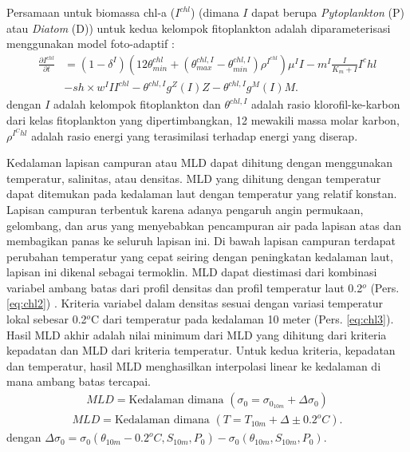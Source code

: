 \begin{spacing}{1.5}
	Persamaan untuk biomassa chl-a ($I^{chl}$) (dimana $I$ dapat berupa \textit{Pytoplankton} (P) atau \textit{Diatom} (D)) untuk kedua kelompok fitoplankton adalah diparameterisasi menggunakan model foto-adaptif :
	\begin{equation}\label{eq:chl1}
		\begin{aligned}
			\frac{\partial I^{chl}}{\partial t} &= (1-\delta ^I)(12\theta^{chl}_{min}+(\theta^{chl,I}_{max}-\theta^{chl,I}_{min})\rho^{I^{chl}})\mu^I I-m^I \frac{I}{K_m +I}I^chl \\
			&- sh \times w^I II^{chl}-\theta^{chl,I}g^Z(I)Z-\theta^{chl,I}g^M(I)M.
		\end{aligned}
	\end{equation}
	dengan $I$ adalah kelompok fitoplankton dan $\theta^{chl,I}$ adalah rasio klorofil-ke-karbon dari kelas fitoplankton yang dipertimbangkan, 12 mewakili massa molar karbon, $\rho^{I^Chl}$ adalah rasio energi yang terasimilasi terhadap energi yang diserap.
	
	Kedalaman lapisan campuran atau MLD dapat dihitung dengan menggunakan temperatur, salinitas, atau densitas. MLD yang dihitung dengan temperatur dapat ditemukan pada kedalaman laut dengan temperatur yang relatif konstan. Lapisan campuran terbentuk karena adanya pengaruh angin permukaan, gelombang, dan arus yang menyebabkan pencampuran air pada lapisan atas dan membagikan panas ke seluruh lapisan ini. Di bawah lapisan campuran terdapat perubahan temperatur yang cepat seiring dengan peningkatan kedalaman laut, lapisan ini dikenal sebagai termoklin. MLD dapat diestimasi dari kombinasi variabel ambang batas dari profil densitas dan profil temperatur laut 0.2$^o$ (Pers. \ref{eq:chl2}) \cite{Boyer2004}. 
	Kriteria variabel dalam densitas sesuai dengan variasi temperatur lokal sebesar 0.2$^o$C dari temperatur pada kedalaman 10 meter (Pers. \ref{eq:chl3}). Hasil MLD akhir adalah nilai minimum dari MLD yang dihitung dari kriteria kepadatan dan MLD dari kriteria temperatur. Untuk kedua kriteria, kepadatan dan temperatur, hasil MLD menghasilkan interpolasi linear ke kedalaman di mana ambang batas tercapai.
	\begin{equation}\label{eq:chl2}
		\begin{aligned}
			MLD= \text{Kedalaman dimana }(\sigma_0=\sigma_{0_{10m}}+\Delta \sigma_0)
		\end{aligned}
	\end{equation}
	\begin{equation}\label{eq:chl3}
		\begin{aligned}
			MLD= \text{Kedalaman dimana }(T=T_{10m}+\Delta \pm 0.2^oC).
		\end{aligned}
	\end{equation}
	dengan $\Delta \sigma_0=\sigma_0(\theta_{10m}-0.2^oC,S_{10m},P_0)-\sigma_0(\theta_{10m},S_{10m},P_0)$.

\end{spacing}
